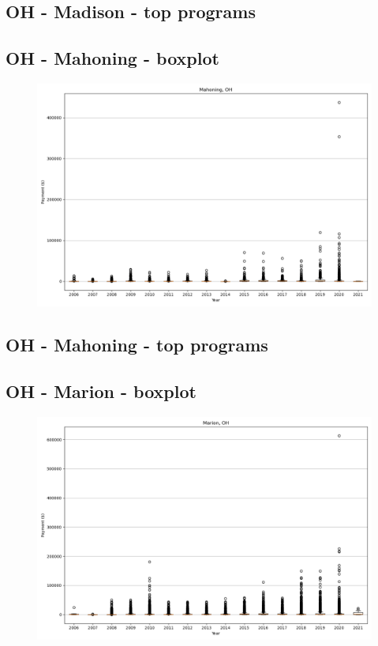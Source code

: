 \subsection*{OH - Madison - top programs}

\newpage
\subsection*{OH - Mahoning - boxplot}
\begin{figure}[h]
\centering
\includegraphics[width=7in]{../output/boxplots/counties/Mahoning-OH_boxplot.png}
\end{figure}


\subsection*{OH - Mahoning - top programs}

\newpage
\subsection*{OH - Marion - boxplot}
\begin{figure}[h]
\centering
\includegraphics[width=7in]{../output/boxplots/counties/Marion-OH_boxplot.png}
\end{figure}


